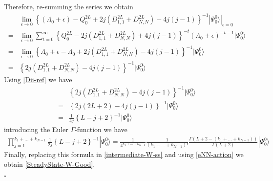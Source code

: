 \documentclass[10pt]{article}
\numberwithin{equation}{section}
\numberwithin{equation}{subsection}
\begin{document}
Therefore, re-summing the series we obtain
\begin{align}
	&\lim_{\epsilon\to 0}\left\{(\Lambda_{0}+\epsilon)-Q_{0}^{2L}+2j(D_{1,1}^{2L}+D_{N,N}^{2L})-4j(j-1)\right\}^{-1}|\Psi_{0}^{0}\rangle|_{\epsilon=0}\nonumber
	\\=&
	\lim_{\epsilon\to 0}\sum_{t=0}^{\infty}\left\{Q_{0}^{2L}-2j(D_{1,1}^{2L}+D_{N,N}^{2L})+4j(j-1)\right\}^{-t}\left(\Lambda_{0}+\epsilon\right)^{-t-1}|\Psi_{0}^{0}\rangle\nonumber
	\\=&
	\lim_{\epsilon\to 0}\left\{\Lambda_{0}+\epsilon-\Lambda_{0}+2j(D_{1,1}^{2L}+D_{N,N}^{2L})-4j(j-1)\right\}^{-1}|\Psi_{0}^{0}\rangle\nonumber
	\\=&
	\left\{2j(D_{1,1}^{2L}+D_{N,N}^{2L})-4j(j-1)\right\}^{-1}|\Psi_{0}^{0}\rangle
\end{align}
Using \eqref{Dii-ref} we have 
\begin{align}
	&\left\{2j(D_{1,1}^{2L}+D_{N,N}^{2L})-4j(j-1)\right\}^{-1}|\Psi_{0}^{0}\rangle\nonumber
	\\=&\left\{2j(2L+2)-4j(j-1)\right\}^{-1}|\Psi_{0}^{0}\rangle\nonumber
	\\=&
	\frac{1}{4j}\left\{L-j+2\right\}^{-1}|\Psi_{0}^{0}\rangle
\end{align}
introducing the Euler $\Gamma$-function we have 
\begin{align}
\prod_{j=1}^{k_{1}+\ldots+k_{N-1}}\frac{1}{2j}\left\{L-j+2\right\}^{-1}|\Psi_{0}^{0}\rangle=\frac{1}{4^{k_{1}+\ldots+k_{N-1}}}\frac{1}{(k_{1}+\ldots+k_{N-1})!}\frac{\Gamma(L+2-(k_{1}+\ldots+k_{N-1}))}{\Gamma(L+2)}|\Psi_{0}^{0}\rangle
\end{align}
Finally, replacing this formula in \eqref{intermediate-W-ss} and using \eqref{eNN-action} we obtain \eqref{SteadyState-W-Good}. 
\begin{flushright}
	$\square$
\end{flushright}
\end{document}
